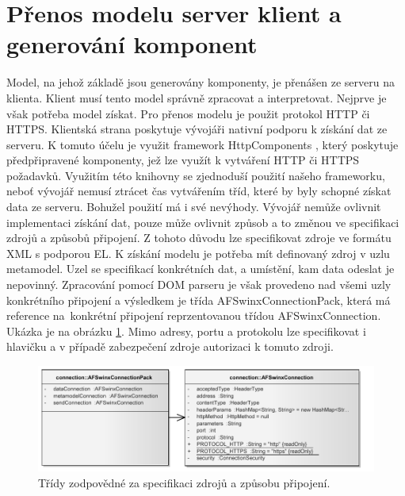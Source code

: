 \section{Přenos modelu server klient a generování komponent}
Model, na jehož základě jsou generovány komponenty, je přenášen ze serveru na klienta. Klient musí tento model správně zpracovat a interpretovat. Nejprve je však potřeba model získat. Pro přenos modelu je použit protokol HTTP či HTTPS. Klientská strana poskytuje vývojáři nativní podporu k získání dat ze serveru. K tomuto účelu je využit framework HttpComponents \cite{apacheHttp}, který poskytuje předpřipravené komponenty, jež lze využít k vytváření HTTP či HTTPS požadavků. Využitím této knihovny se zjednoduší použití našeho frameworku, neboť vývojář nemusí ztrácet čas vytvářením tříd, které by byly schopné získat data ze serveru. Bohužel použití má i své nevýhody. Vývojář nemůže ovlivnit implementaci získání dat, pouze může ovlivnit způsob a to změnou ve specifikaci zdrojů a způsobů připojení. Z tohoto důvodu lze specifikovat zdroje ve formátu XML s podporou EL. K získání modelu je potřeba mít definovaný zdroj v uzlu metamodel. Uzel se specifikací konkrétních dat, a umístění, kam data odeslat je nepovinný. Zpracování pomocí DOM parseru je však provedeno nad všemi uzly konkrétního připojení a výsledkem je třída AFSwinxConnectionPack, která má reference na~konkrétní připojení reprzentovanou třídou AFSwinxConnection. Ukázka je na obrázku \ref{img:connectionPack}. Mimo adresy, portu a protokolu lze specifikovat i hlavičku a v případě zabezpečení zdroje autorizaci k tomuto zdroji.

\begin{figure}[h!]
\includegraphics{images/connectionPack}
\caption{Třídy zodpovědné za specifikaci zdrojů a způsobu připojení.}
\label{img:connectionPack}
\end{figure}


